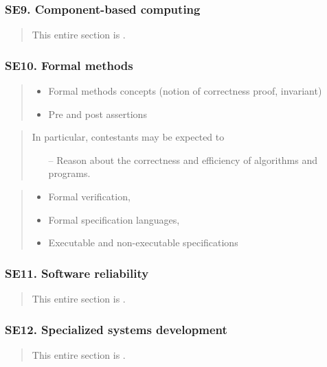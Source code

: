 \documentclass[a4paper,11pt,oneside]{article}
\newcommand{\cmark}{\ding{51}}%
\newcommand{\xmark}{\ding{55}}%
\newcommand{\CC}[1]{#1}
\newcommand{\Ccodeonly}{{\small\cmark\faFileText}}
\newcommand{\Cexcluded}{{\small\xmark}}
\newcommand{\Icodeonly}{\item[\hbox to 1.8em{\Ccodeonly\hfill}]}
\newcommand{\Iexcluded}{\item[\hbox to 1.8em{\Cexcluded\hfill}]}
\newenvironment{myitemize}{\begin{quote}\begin{itemize}\itemsep 0pt}{\end{itemize}\end{quote}}
\begin{document}
    \subsubsection*{SE9. Component-based computing}

        \begin{quote}
        This entire section is \Cexcluded.
        \end{quote}

    \subsubsection*{SE10. Formal methods}

        \begin{myitemize}
        \Icodeonly\CC{Formal methods concepts} (notion of correctness proof, invariant)
        \Icodeonly\CC{Pre and post assertions}
        \end{myitemize}

        \begin{quote}
        In particular, contestants may be expected to
        \begin{itemize}
        \itemsep -3pt
        \item[--] Reason about the correctness and efficiency of algorithms and programs.
        \end{itemize}
        \end{quote}

        \begin{myitemize}
        \Iexcluded\CC{Formal verification},
        \Iexcluded\CC{Formal specification languages},
        \Iexcluded\CC{Executable and non-executable specifications}
        \end{myitemize}

    \subsubsection*{SE11. Software reliability}

        \begin{quote}
        This entire section is \Cexcluded.
        \end{quote}

    \subsubsection*{SE12. Specialized systems development}
  
        \begin{quote}
        This entire section is \Cexcluded.
        \end{quote}
\end{document}
